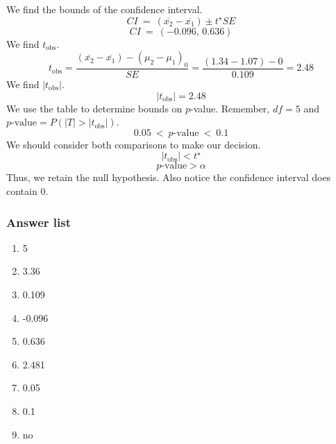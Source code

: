 \documentclass[11pt,containsverbatim,handout]{beamer}
\begin{document}
\begin{frame} \small
We find the
bounds of the confidence interval.
\[CI ~=~ (\overline{x_2}-\overline{x_1})\pm t^{\star} SE\]
\[CI ~=~ (-0.096,\, 0.636) \] We find \(t_\text{obs}\).
\[t_\text{obs} = \frac{(\overline{x_2}-\overline{x_1})-(\mu_2-\mu_1)_0}{SE} = \frac{(1.34-1.07)-0}{0.109} = 2.48\]
We find \(|t_\text{obs}|\). \[|t_\text{obs}| = 2.48 \] We use the table
to determine bounds on \(p\)-value. Remember, \(df=5\) and
\(p\text{-value} = P(|T|>|t_\text{obs}|)\).
\[0.05 ~<~ p\text{-value} ~<~ 0.1\] We should consider both comparisons
to make our decision. \[|t_\text{obs}| < t^{\star} \]
\[p\text{-value} > \alpha \] Thus, we retain the null hypothesis. Also
notice the confidence interval does contain 0.
\end{frame}

\begin{frame}
\frametitle{Answer list}
\begin{enumerate}
  \item 5
  \item 3.36
  \item 0.109
  \item -0.096
  \item 0.636
  \item 2.481
  \item 0.05
  \item 0.1
  \item no
\end{enumerate}
\end{frame}
\end{document}

